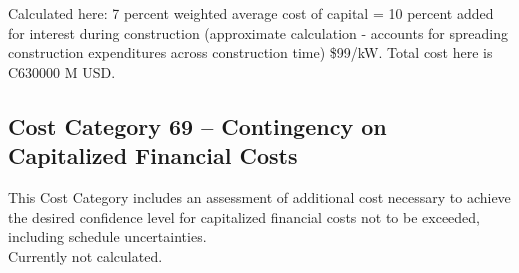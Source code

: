 Calculated here: 7 percent weighted average cost of capital = 10 percent added for interest during 
construction (approximate calculation - accounts for spreading construction expenditures across construction time) \$99/kW. Total cost here is C630000 M USD.

\subsection*{Cost Category 69 – Contingency on Capitalized Financial Costs}
This Cost Category includes an assessment of additional cost necessary to achieve the desired confidence level for capitalized financial costs not to be exceeded, including schedule uncertainties.\\

Currently not calculated.



